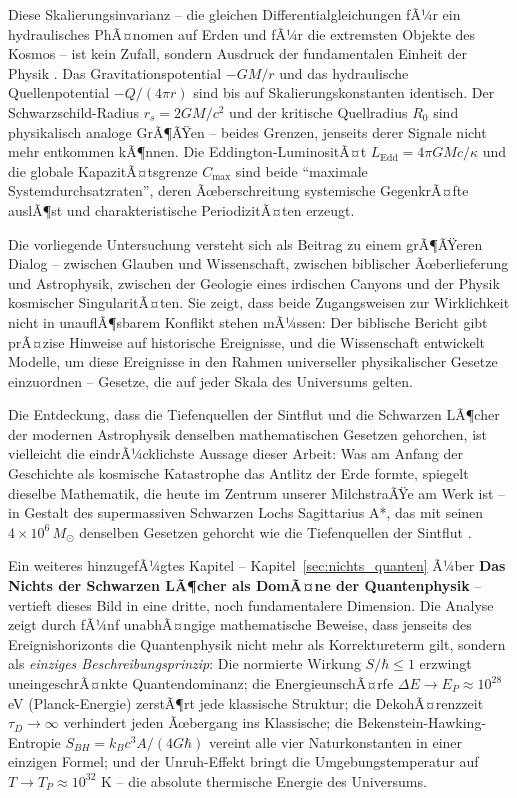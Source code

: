﻿\documentclass[12pt,a4paper]{report}
\begin{document}
Diese Skalierungsinvarianz -- die gleichen Differentialgleichungen fÃ¼r ein hydraulisches PhÃ¤nomen auf Erden und fÃ¼r die extremsten Objekte des Kosmos -- ist kein Zufall, sondern Ausdruck der fundamentalen Einheit der Physik \cite{penrose2004,misner1973}. Das Gravitationspotential $-GM/r$ und das hydraulische Quellenpotential $-Q/(4\pi r)$ sind bis auf Skalierungskonstanten identisch. Der Schwarzschild-Radius $r_s = 2GM/c^2$ und der kritische Quellradius $R_0$ sind physikalisch analoge GrÃ¶ÃŸen -- beides Grenzen, jenseits derer Signale nicht mehr entkommen kÃ¶nnen. Die Eddington-LuminositÃ¤t $L_{\mathrm{Edd}} = 4\pi GMc/\kappa$ und die globale KapazitÃ¤tsgrenze $C_{\max}$ sind beide "`maximale Systemdurchsatzraten"', deren Ãœberschreitung systemische GegenkrÃ¤fte auslÃ¶st und charakteristische PeriodizitÃ¤ten erzeugt.

Die vorliegende Untersuchung versteht sich als Beitrag zu einem grÃ¶ÃŸeren Dialog -- zwischen Glauben und Wissenschaft, zwischen biblischer Ãœberlieferung und Astrophysik, zwischen der Geologie eines irdischen Canyons und der Physik kosmischer SingularitÃ¤ten. Sie zeigt, dass beide Zugangsweisen zur Wirklichkeit nicht in unauflÃ¶sbarem Konflikt stehen mÃ¼ssen: Der biblische Bericht gibt prÃ¤zise Hinweise auf historische Ereignisse, und die Wissenschaft entwickelt Modelle, um diese Ereignisse in den Rahmen universeller physikalischer Gesetze einzuordnen -- Gesetze, die auf jeder Skala des Universums gelten.

Die Entdeckung, dass die Tiefenquellen der Sintflut und die Schwarzen LÃ¶cher der modernen Astrophysik denselben mathematischen Gesetzen gehorchen, ist vielleicht die eindrÃ¼cklichste Aussage dieser Arbeit: Was am Anfang der Geschichte als kosmische Katastrophe das Antlitz der Erde formte, spiegelt dieselbe Mathematik, die heute im Zentrum unserer MilchstraÃŸe am Werk ist -- in Gestalt des supermassiven Schwarzen Lochs Sagittarius A*, das mit seinen $4 \times 10^6\, M_\odot$ denselben Gesetzen gehorcht wie die Tiefenquellen der Sintflut \cite{kormendy2013}.

\medskip

Ein weiteres hinzugefÃ¼gtes Kapitel -- Kapitel~\ref{sec:nichts_quanten} Ã¼ber \textbf{Das Nichts der Schwarzen LÃ¶cher als DomÃ¤ne der Quantenphysik} -- vertieft dieses Bild in eine dritte, noch fundamentalere Dimension. Die Analyse zeigt durch fÃ¼nf unabhÃ¤ngige mathematische Beweise, dass jenseits des Ereignishorizonts die Quantenphysik nicht mehr als Korrektureterm gilt, sondern als \emph{einziges Beschreibungsprinzip}: Die normierte Wirkung $S/\hbar \leq 1$ erzwingt uneingeschrÃ¤nkte Quantendominanz; die EnergieunschÃ¤rfe $\Delta E \to E_P \approx 10^{28}$ eV (Planck-Energie) zerstÃ¶rt jede klassische Struktur; die DekohÃ¤renzzeit $\tau_D \to \infty$ verhindert jeden Ãœbergang ins Klassische; die Bekenstein-Hawking-Entropie $S_{BH} = k_B c^3 A/(4G\hbar)$ vereint alle vier Naturkonstanten in einer einzigen Formel; und der Unruh-Effekt \cite{unruh1976} bringt die Umgebungstemperatur auf $T \to T_P \approx 10^{32}$ K -- die absolute thermische Energie des Universums.
\end{document}
